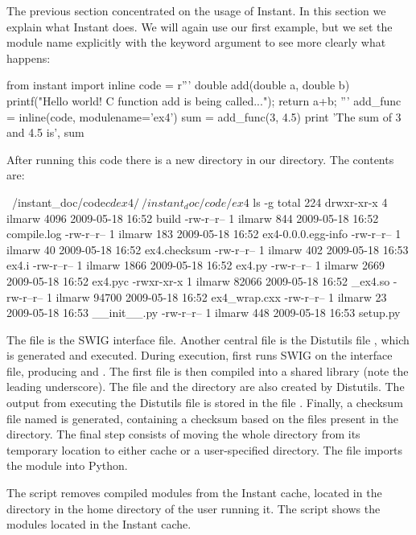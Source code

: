 The previous section concentrated on the usage of Instant.  In this
section we explain what Instant does.  We will again use our first
example, but we set the module name explicitly with the keyword
argument  to see more clearly what happens:
\begin{python}
from instant import inline
code = r'''
double add(double a, double b)
{
  printf("Hello world! C function add is being called...\n");
  return a+b;
}'''
add_func = inline(code, modulename='ex4')
sum = add_func(3, 4.5)
print 'The sum of 3 and 4.5 is', sum
\end{python}
After running this code there is a new directory  in our directory.
The contents are:
\begin{progoutput}
~/instant_doc/code$ cd ex4/
~/instant_doc/code/ex4$ ls -g
total 224
drwxr-xr-x 4 ilmarw  4096 2009-05-18 16:52 build
-rw-r--r-- 1 ilmarw   844 2009-05-18 16:52 compile.log
-rw-r--r-- 1 ilmarw   183 2009-05-18 16:52 ex4-0.0.0.egg-info
-rw-r--r-- 1 ilmarw    40 2009-05-18 16:52 ex4.checksum
-rw-r--r-- 1 ilmarw   402 2009-05-18 16:53 ex4.i
-rw-r--r-- 1 ilmarw  1866 2009-05-18 16:52 ex4.py
-rw-r--r-- 1 ilmarw  2669 2009-05-18 16:52 ex4.pyc
-rwxr-xr-x 1 ilmarw 82066 2009-05-18 16:52 _ex4.so
-rw-r--r-- 1 ilmarw 94700 2009-05-18 16:52 ex4_wrap.cxx
-rw-r--r-- 1 ilmarw    23 2009-05-18 16:53 __init__.py
-rw-r--r-- 1 ilmarw   448 2009-05-18 16:53 setup.py
\end{progoutput}
The file  is the SWIG interface file.
Another central file is the Distutils file , which is generated
and executed. During execution,  first runs SWIG on the interface file,
producing  and . The first file
is then compiled into a shared library  
(note the leading underscore). The file 
and the directory  are also created by Distutils.
The output from executing the Distutils file is stored in the file
.  Finally, a checksum file named
 is generated, containing a checksum based on
the files present in the directory. The final step consists of moving
the whole directory from its temporary location to either cache or a
user-specified directory. The file 
imports the module
 into Python.

The script  removes
compiled modules from the Instant cache, located in the directory
 in the home directory of the user running it.
The script 
shows the modules located in the Instant cache.

